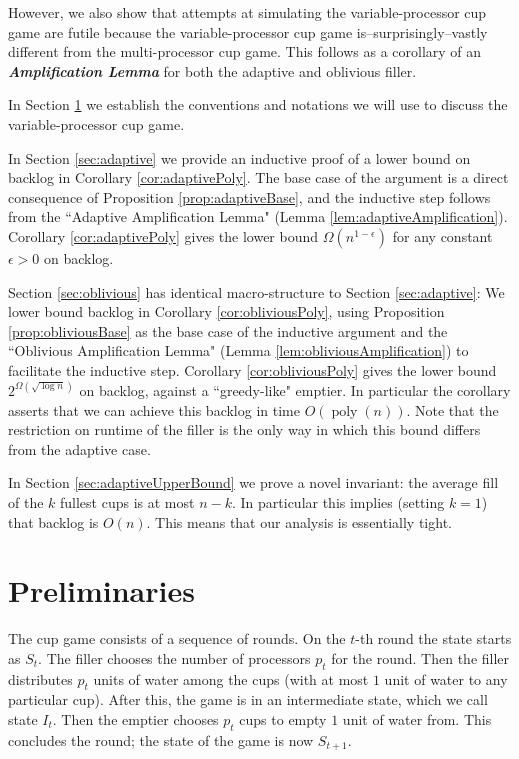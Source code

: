 \documentclass[twocolumn]{article}[11pt]
\newcommand{\defn}[1]{{\textit{\textbf{\boldmath #1}}}}
\renewcommand{\paragraph}[1]{\vspace{0.09in}\noindent{\bf \boldmath #1.}}
\DeclareMathOperator{\poly}{\text{poly}}
\begin{document}
However, we also show that attempts at simulating the variable-processor cup
game are futile because the variable-processor cup game
is--surprisingly--vastly different from the multi-processor cup game. This
follows as a corollary of an \defn{Amplification Lemma} for both the adaptive and oblivious filler.

\paragraph{Outline and Results}
In Section \ref{sec:prelims} we establish the conventions and notations we will
use to discuss the variable-processor cup game. 

In Section \ref{sec:adaptive} we provide an inductive
proof of a lower bound on backlog in Corollary \ref{cor:adaptivePoly}.
The base case of the argument is a direct consequence of Proposition
\ref{prop:adaptiveBase}, and the inductive step follows from the ``Adaptive
Amplification Lemma" (Lemma \ref{lem:adaptiveAmplification}). Corollary \ref{cor:adaptivePoly}
gives the lower bound $\Omega(n^{1-\epsilon})$ for any constant $\epsilon>0$ on
backlog.

Section \ref{sec:oblivious} has identical macro-structure to Section
\ref{sec:adaptive}: We lower bound backlog in
Corollary \ref{cor:obliviousPoly}, using Proposition \ref{prop:obliviousBase}
as the base case of the inductive argument and the ``Oblivious Amplification Lemma" (Lemma
\ref{lem:obliviousAmplification}) to facilitate the inductive step. Corollary
\ref{cor:obliviousPoly} gives the lower bound $2^{\Omega(\sqrt{\log n})}$ on
backlog, against a ``greedy-like" emptier. In particular the corollary asserts
that we can achieve this backlog in time $O(\poly(n))$. Note that the
restriction on runtime of the filler is the only way in which this bound
differs from the adaptive case.

In Section \ref{sec:adaptiveUpperBound} we prove a novel invariant: the average
fill of the $k$ fullest cups is at most $n-k$. In particular this implies
(setting $k=1$) that backlog is $O(n)$. This means that our analysis is essentially tight.

\section{Preliminaries}\label{sec:prelims}
The cup game consists of a sequence of rounds. On the $t$-th round the state
starts as $S_t$. The filler chooses the number of processors $p_t$ for the round. 
Then the filler distributes $p_t$ units of water among the cups (with at most
$1$ unit of water to any particular cup). After this, the game is in an intermediate
state, which we call state $I_t$. Then the emptier chooses
$p_t$ cups to empty $1$ unit of water from. This concludes the round; the state of the game is now $S_{t+1}$.
\end{document}
